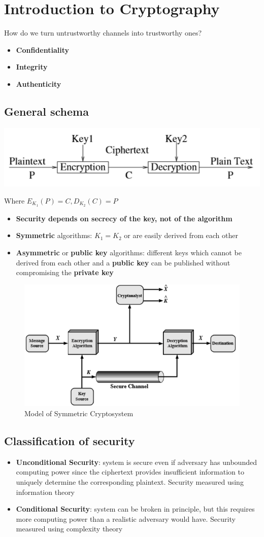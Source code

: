 \documentclass[12pt, a4paper]{report}
\begin{document}
\chapter{Introduction to Cryptography}
How do we turn untrustworthy channels into trustworthy ones?
\begin{itemize}
    \item \textbf{Confidentiality}
    \item \textbf{Integrity}
    \item \textbf{Authenticity}
\end{itemize}
\section{General schema}
\begin{center}
    \includegraphics[width=.5\textwidth]{Immagini/schemacrittografia.png}
\end{center}
Where $E_{K_{1}}(P)=C, D_{K_{2}}(C)=P$
\begin{itemize}
    \item \textbf{Security depends on secrecy of the key, not of the algorithm}
    \item \textbf{Symmetric} algorithms: $K_{1}=K_{2}$ or are easily derived from each other
    \item \textbf{Asymmetric} or \textbf{public key} algorithms: different keys which cannot be derived  from each other and a \textbf{public key} can be published without compromising the \textbf{private key}
\end{itemize}
\begin{figure}[h]
    \centering
    \includegraphics[width=.5\textwidth]{Immagini/chiavesimmetrica.png} 
    \caption{Model of Symmetric Cryptosystem}
\end{figure}
\section{Classification of security}
\begin{itemize}
    \item \textbf{Unconditional Security}: system is secure even if adversary has unbounded computing power since the ciphertext provides insufficient information to uniquely determine the corresponding plaintext. Security measured using information theory
    \item \textbf{Conditional Security}: system can be broken in principle, but  this requires more computing power than a realistic adversary would have. Security measured using complexity theory
\end{itemize}
\end{document}
